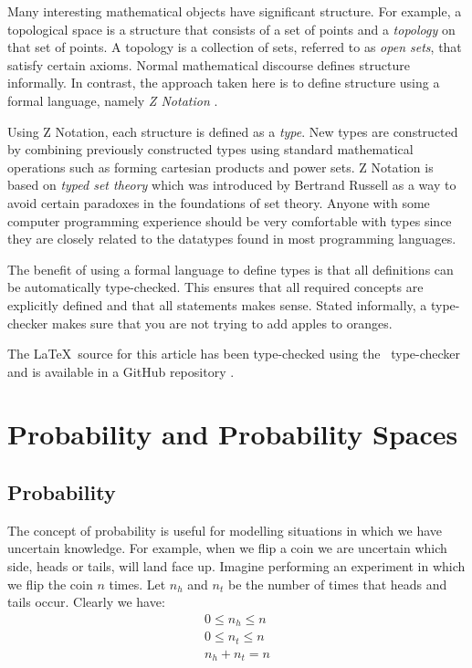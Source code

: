 \documentclass{article}
\begin{document}
Many interesting mathematical objects have significant structure. 
For example, a topological space is a structure that consists of a set of points and a {\it topology} on that set of points.
A topology is a collection of sets, referred to as {\it open sets}, that satisfy certain axioms.
Normal mathematical discourse defines structure informally.
In contrast, the approach taken here is to define structure using a formal language, namely {\it Z Notation} \cite{spivey:zrm}.

Using Z Notation, each structure is defined as a {\it type}.
New types are constructed by combining previously constructed types using standard mathematical operations such as forming cartesian products and power sets.
Z Notation is based on {\it typed set theory} which was introduced by Bertrand Russell as a way to avoid certain paradoxes in the foundations
of set theory.
Anyone with some computer programming experience should be very comfortable with types since they are closely related to the datatypes
found in most programming languages.

The benefit of using a formal language to define types is that all definitions can be automatically type-checked.
This ensures that all required concepts are explicitly defined and that all statements makes sense.
Stated informally, a type-checker makes sure that you are not trying to add apples to oranges.

The \LaTeX\ source for this article has been type-checked using the \fuzz\ type-checker \cite{spivey:fuzz}
and is available in a GitHub repository \cite{agryman:probability-and-statistics}.

\section{Probability and Probability Spaces}

\subsection{Probability}

The concept of probability is useful for modelling situations in which we have uncertain knowledge.
For example, when we flip a coin we are uncertain which side, heads or tails, will land face up.
Imagine performing an experiment in which we flip the coin $n$ times.
Let $n_h$ and $n_t$ be the number of times that heads and tails occur.
Clearly we have:
\begin{eqnarray}
	0 \le n_h \le n \\
	0 \le n_t \le n \\
	n_h + n_t = n
\end{eqnarray}
\end{document}
